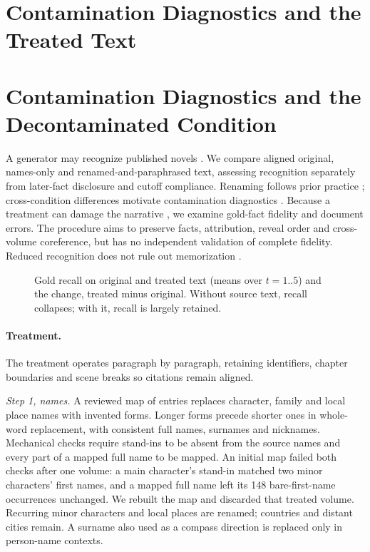 \ifdefined\nwvtwo
\section{Contamination Diagnostics and the Treated Text}
\else
\section{Contamination Diagnostics and the Decontaminated Condition}
\fi
\label{app:contamination}

A generator may recognize published novels \citep{chang2023speak}. We compare aligned
original, names-only and renamed-and-paraphrased text, assessing recognition separately
from later-fact disclosure and cutoff compliance. Renaming follows prior practice
\citep{gupta2025whodunit, zhang2024infinitebench}; cross-condition differences motivate
contamination diagnostics \citep{dekoninck2024constat}. Because a treatment can damage
the narrative \citep{sun2025emperor}, we examine gold-fact fidelity and document errors.
The procedure aims to preserve facts, attribution, reveal order and cross-volume
coreference, but has no independent validation of complete fidelity. Reduced recognition
does not rule out memorization \citep{cheng2025contamination}.

\ifdefined\nwvtwo %
\begin{figure}[t]
\centering

\caption{Gold recall on original and treated text (means over $t=1..5$) and the change,
treated minus original. Without source text, recall collapses; with it, recall is largely
retained.}
\label{fig:deconrecall}
\end{figure}
\fi

\paragraph{Treatment.}
The treatment operates paragraph by paragraph, retaining identifiers, chapter boundaries
and scene breaks so citations remain aligned.

\emph{Step 1, names.} A reviewed map of  entries replaces character,
family and local place names with invented forms. Longer forms precede shorter ones
in whole-word replacement, with consistent full names, surnames and nicknames.
Mechanical checks require stand-ins to be absent from the source names and every part
of a mapped full name to be mapped. An initial map failed both checks after one volume:
a main character's stand-in matched two minor characters' first names, and a mapped
full name left its 148 bare-first-name occurrences unchanged. We rebuilt the map and
discarded that treated volume. Recurring minor characters and local places are renamed;
countries and distant cities remain. A surname also used as a compass direction is
replaced only in person-name contexts.

